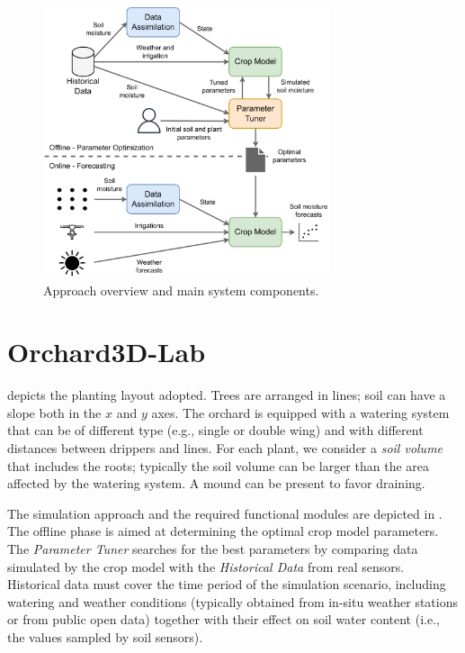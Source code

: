 \begin{figure}[t]
	\centering
	\includegraphics[width=0.75\textwidth]{chapters/physics-aware/orchard/img/overview.pdf}
	\caption{Approach overview and main system components.}
	\label{orchard-fig:overview}
\end{figure}


\section{Orchard3D-Lab}

 depicts the planting layout adopted.
 Trees are arranged in lines; soil can have a slope both in the $x$ and $y$ axes. The orchard is equipped with a watering system that can be of different type (e.g., single or double wing) and with different distances between drippers and lines. For each plant, we consider a \emph{soil volume} that includes the roots; typically the soil volume can be larger than the area affected by the watering system. A mound can be present to favor draining.

The simulation approach and the required functional modules are depicted in . The offline phase is aimed at determining the optimal crop model parameters. The \emph{Parameter Tuner} searches for the best parameters by comparing data simulated by the crop model with the \emph{Historical Data} from real sensors.
Historical data must cover the time period of the simulation scenario, including watering and weather conditions (typically obtained from in-situ weather stations or from public open data) together with their effect on soil water content (i.e., the values sampled by soil sensors).

